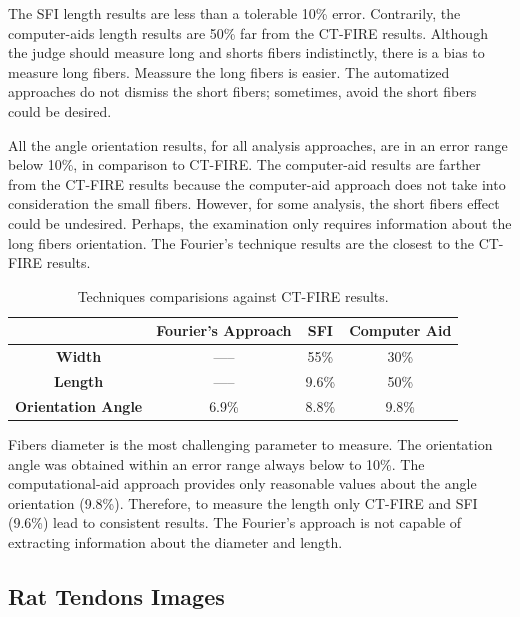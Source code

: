 \documentclass[12pt,a4paper]{article}
\begin{document}
The SFI length results are less than a tolerable 10\% error. Contrarily, the computer-aids length results are 50\% far from the CT-FIRE results. Although the judge should measure long and shorts fibers indistinctly, there is a bias to measure long fibers. Meassure the long fibers is easier. The automatized approaches do not dismiss the short fibers; sometimes, avoid the short fibers could be desired.

All the angle orientation results,  for all analysis approaches, are in an error range below 10\%, in comparison to CT-FIRE. The computer-aid results are farther from the CT-FIRE results because the computer-aid approach does not take into consideration the small fibers. However, for some analysis, the short fibers effect could be undesired. Perhaps, the examination only requires information about the long fibers orientation. The Fourier’s technique results are the closest to the CT-FIRE results.

\begin {table}[H]
\begin{center}
\begin{tabular}{ |c|c|c|c| }
\hline
 & \bf{Fourier's Approach} & \bf{SFI} & \bf{Computer Aid} \\
 \hline
 \bf{Width} & ----- & 55\% & 30\% \\ 
 \hline
 \bf{Length} & ----- & 9.6\% & 50\% \\ 
 \hline
 \bf{Orientation Angle} & 6.9\% & 8.8\% & 9.8\% \\ 
\hline    
\end{tabular}
\caption {Techniques comparisions against CT-FIRE results.}
\footnotesize
\begin{flushleft}
Fibers diameter is the most challenging parameter to measure. The orientation angle was obtained within an error range always below to 10\%. The computational-aid approach provides only reasonable values about the angle orientation (9.8\%). Therefore, to measure the length only CT-FIRE and SFI (9.6\%) lead to consistent results. The Fourier’s approach is not capable of extracting information about the diameter and length.
\end{flushleft}

\end{center} 
\end {table}

\subsection{Rat Tendons Images}
\end{document}
